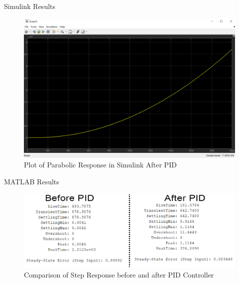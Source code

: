 \documentclass[10pt,compress,mathserif]{beamer}
\begin{document}
\begin{frame}{Simulink Results}

	\begin{figure}[h!]
		\centering
		\includegraphics[scale=0.35]{images/parabolicResponse_PID_Simulink.png}
		\caption{Plot of Parabolic Response in Simulink After PID}
	\end{figure}
\end{frame}


\begin{frame}{MATLAB Results}
\begin{figure}[h!]
	\centering
	\includegraphics[scale=0.6]{images/SSE_MATLAB.png}
	\caption{Comparison of Step Response before and after PID Controller}
\end{figure}

\end{frame}
\end{document}
